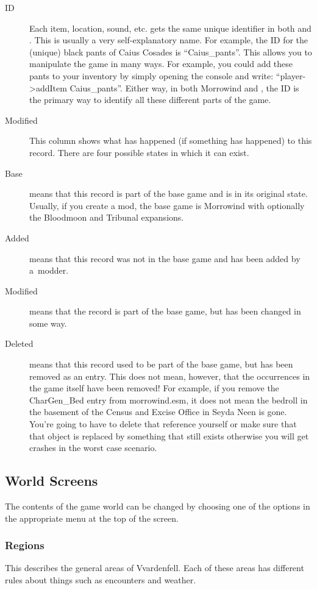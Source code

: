 \begin{description}
\item[ID] Each item, location, sound, etc. gets the same unique identifier in both \OCS{} and \MW. This is usually a very self-explanatory name.
For example, the ID for the (unique) black pants of Caius Cosades is ``Caius\_pants''. This allows you to manipulate the game in many ways. For example,
you could add these pants to your inventory by simply opening the console and write: ``player->addItem Caius\_pants''. Either way, in both Morrowind 
and \OCS, the ID is the primary way to identify all these different parts of the game. %
\item[Modified] This column shows what has happened (if something has happened) to this record. There are four possible states in which it can exist. 
\item[Base] means that this record is part of the base game and is in its original state. Usually, if you create a mod, the base game is Morrowind with
optionally the Bloodmoon and Tribunal expansions.
\item[Added] means that this record was not in the base game and has been added by a~modder.
\item[Modified] means that the record is part of the base game, but has been changed in some way.
\item[Deleted] means that this record used to be part of the base game, but has been removed as an entry. This does not mean, however, that the occurrences
in the game itself have been removed! For example, if you remove the CharGen\_Bed entry from morrowind.esm, it does not mean the bedroll in the basement
of the Census and Excise Office in Seyda Neen is gone. You're going to have to delete that reference yourself or make sure that that object is replaced
by something that still exists otherwise you will get crashes in the worst case scenario.
\end{description}

\subsection{World Screens}
The contents of the game world can be changed by choosing one of the options in the appropriate menu at the top of the screen.

\subsubsection{Regions}
This describes the general areas of Vvardenfell. Each of these areas has different rules about things such as encounters and weather.


